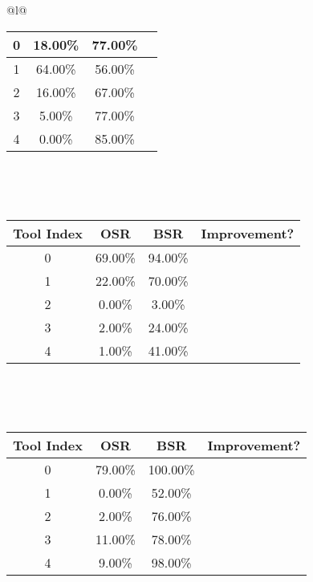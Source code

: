 \begin{longtable}{@{}l@{}}
\begin{minipage}{\textwidth}
\begin{tabular}{|c|c|c|c|}
0 & 18.00\% & 77.00\% & \textcolor{green}{\ding{51}} \\ \hline
1 & 64.00\% & 56.00\% & \textcolor{red}{\ding{55}} \\ \hline
2 & 16.00\% & 67.00\% & \textcolor{green}{\ding{51}} \\ \hline
3 & 5.00\% & 77.00\% & \textcolor{green}{\ding{51}} \\ \hline
4 & 0.00\% & 85.00\% & \textcolor{green}{\ding{51}} \\ \hline
\end{tabular}
\end{minipage}\\[2ex]
\begin{minipage}{\textwidth}
\centering\vspace{2ex}
\\[0.8ex]
\begin{tabular}{|c|c|c|c|} \hline
\textbf{Tool Index} & \textbf{OSR} & \textbf{ BSR} & \textbf{Improvement?} \\ \hline
0 & 69.00\% & 94.00\% & \textcolor{green}{\ding{51}} \\ \hline
1 & 22.00\% & 70.00\% & \textcolor{green}{\ding{51}} \\ \hline
2 & 0.00\% & 3.00\% & \textcolor{green}{\ding{51}} \\ \hline
3 & 2.00\% & 24.00\% & \textcolor{green}{\ding{51}} \\ \hline
4 & 1.00\% & 41.00\% & \textcolor{green}{\ding{51}} \\ \hline
\end{tabular}
\end{minipage}\\[2ex]
\begin{minipage}{\textwidth}
\centering\vspace{2ex}
\\[0.8ex]
\begin{tabular}{|c|c|c|c|} \hline
\textbf{Tool Index} & \textbf{OSR} & \textbf{ BSR} & \textbf{Improvement?} \\ \hline
0 & 79.00\% & 100.00\% & \textcolor{green}{\ding{51}} \\ \hline
1 & 0.00\% & 52.00\% & \textcolor{green}{\ding{51}} \\ \hline
2 & 2.00\% & 76.00\% & \textcolor{green}{\ding{51}} \\ \hline
3 & 11.00\% & 78.00\% & \textcolor{green}{\ding{51}} \\ \hline
4 & 9.00\% & 98.00\% & \textcolor{green}{\ding{51}} \\ \hline

\end{tabular}
\end{minipage}
\end{longtable}

